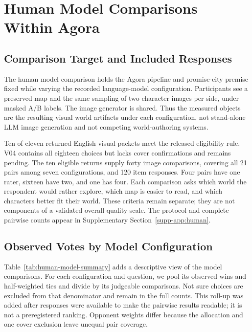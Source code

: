 \section{Human Model Comparisons Within Agora}
\label{sec:human-results}

\subsection{Comparison Target and Included Responses}
The human model comparison holds the Agora pipeline and promise-city premise
fixed while varying the recorded language-model configuration. Participants
see a preserved map and the same sampling of two character images per side,
under masked A/B labels. The image generator is shared. Thus the measured
objects are the resulting visual world artifacts under each configuration,
not stand-alone LLM image generation and not competing world-authoring systems.

Ten of eleven returned English visual packets meet the released eligibility
rule. V04 contains all eighteen choices but lacks cover confirmations and
remains pending. The ten eligible returns supply forty image comparisons,
covering all 21 pairs among seven configurations, and 120 item responses.
Four pairs have one rater, sixteen have two, and one has four. Each comparison
asks which world the respondent would rather explore, which map is easier
to read, and which characters better fit their world. These criteria remain
separate; they are not components of a validated overall-quality scale.
The protocol and complete pairwise counts appear in Supplementary Section~\ref{supp-app:human}.

\subsection{Observed Votes by Model Configuration}
Table~\ref{tab:human-model-summary} adds a descriptive view of the model
comparisons. For each configuration and question, we pool its observed wins
and half-weighted ties and divide by its judgeable comparisons. Not sure
choices are excluded from that denominator and remain in the full counts.
This roll-up was added after responses were available to make the pairwise
results readable; it is not a preregistered ranking. Opponent weights differ
because the allocation and one cover exclusion leave unequal pair coverage.

\begin{table}[t]
\centering\small
\setlength{\tabcolsep}{5pt}

\caption{Observed model-comparison votes on the single promise-city scene.
Each cell is (wins + half ties) / judgeable comparisons, followed by its
percentage. Not sure is excluded; half-integer numerators indicate a tie.
Rows retain recorded model identifiers in fixed order. Models have unequal
opponent weights, so these descriptive scores are not a balanced tournament,
a general capability ranking, or independent samples across rows.}
\label{tab:human-model-summary}
\end{table}

